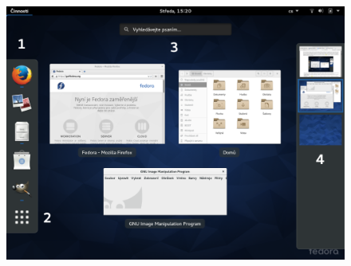 \begin{figure}[t]
\begin{center}
\includegraphics[width=\textwidth]{img/shell-b}
 \label{fig:shell-b}
\end{center}
\end{figure}

